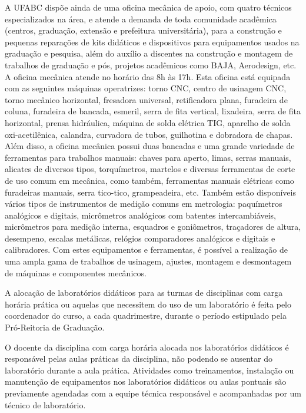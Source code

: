 A UFABC dispõe ainda de uma oficina mecânica de apoio, com quatro técnicos
especializados na área, e atende a demanda de toda comunidade acadêmica
(centros, graduação, extensão e prefeitura universitária), para a construção e
pequenas reparações de kits didáticos e dispositivos para equipamentos usados
na graduação e pesquisa, além do auxílio a discentes na construção e montagem de
trabalhos de graduação e pós, projetos acadêmicos como BAJA, Aerodesign, etc.
A oficina mecânica atende no horário das 8h às 17h.
Esta oficina está equipada com as seguintes máquinas operatrizes: torno CNC,
centro de usinagem CNC, torno mecânico horizontal, fresadora universal,
retificadora plana, furadeira de coluna, furadeira de bancada, esmeril, serra
de fita vertical, lixadeira, serra de fita horizontal, prensa hidráulica,
máquina de solda elétrica TIG, aparelho de solda oxi-acetilênica, calandra,
curvadora de tubos, guilhotina e dobradora de chapas. 
Além disso, a oficina mecânica possui duas bancadas e uma grande variedade de
ferramentas para trabalhos manuais: chaves para aperto, limas, serras manuais,
alicates de diversos tipos, torquímetros, martelos e diversas ferramentas de
corte de uso comum em mecânica, como também, ferramentas manuais elétricas como
furadeiras manuais, serra tico-tico, grampeadeira, etc. 
Também estão disponíveis vários tipos de instrumentos de medição comuns em
metrologia: paquímetros analógicos e digitais, micrômetros analógicos com
batentes intercambiáveis, micrômetros para medição interna, esquadros e
goniômetros, traçadores de altura, desempeno, escalas metálicas, relógios
comparadores analógicos e digitais e calibradores.
Com estes equipamentos e ferramentas, é possível a realização de uma ampla gama
de trabalhos de usinagem, ajustes, montagem e desmontagem de máquinas e
componentes mecânicos.

A alocação de laboratórios didáticos para as turmas de disciplinas com carga
horária prática ou aquelas que necessitem do uso de um laboratório é feita pelo
coordenador do curso, a cada quadrimestre, durante o período estipulado pela
Pró-Reitoria de Graduação.

O docente da disciplina com carga horária alocada nos laboratórios didáticos é
responsável pelas aulas práticas da disciplina, não podendo se ausentar do
laboratório durante a aula prática.
Atividades como treinamentos, instalação ou manutenção de equipamentos nos
laboratórios didáticos ou aulas pontuais são previamente agendadas com a equipe
técnica responsável e acompanhadas por um técnico de laboratório.

